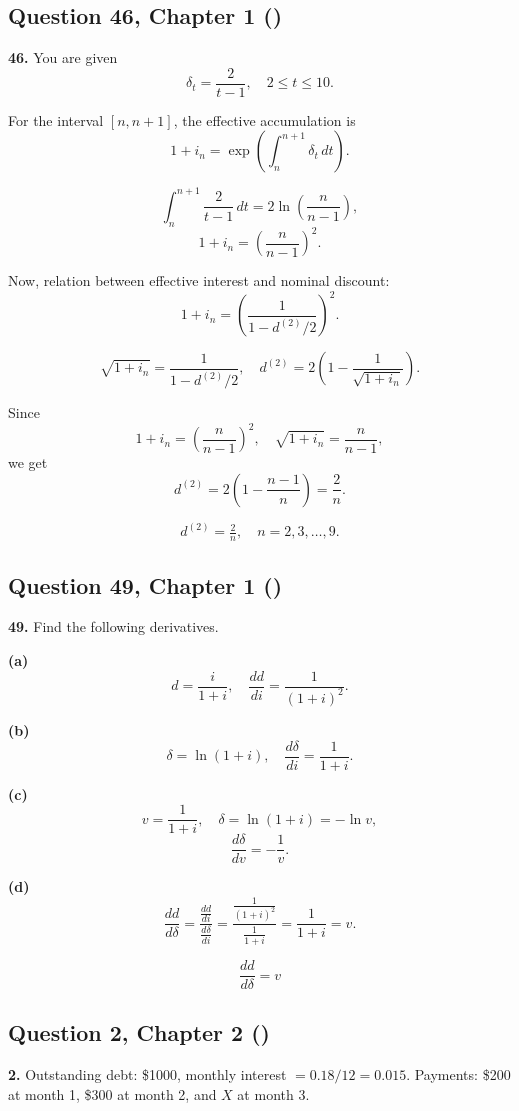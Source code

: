\documentclass[12pt, a4paper]{article}
\begin{document}
\subsection*{Question 46, Chapter 1  (\cite{toi3rd})}    

\textbf{46.} You are given 
\[
\delta_t = \frac{2}{t-1}, \quad 2 \leq t \leq 10.
\]

For the interval \([n, n+1]\), the effective accumulation is
\[
1+i_n = \exp\!\left(\int_n^{n+1} \delta_t \, dt\right).
\]

\[
\int_n^{n+1} \frac{2}{t-1} \, dt 
= 2 \ln\!\left(\frac{n}{n-1}\right),
\]
\[
1+i_n = \left(\frac{n}{n-1}\right)^2.
\]

Now, relation between effective interest and nominal discount:
\[
1+i_n = \left(\frac{1}{1-d^{(2)}/2}\right)^2.
\]

\[
\sqrt{1+i_n} = \frac{1}{1-d^{(2)}/2},
\quad d^{(2)} = 2\left(1 - \frac{1}{\sqrt{1+i_n}}\right).
\]

Since 
\[
1+i_n = \left(\frac{n}{n-1}\right)^2,
\quad \sqrt{1+i_n} = \frac{n}{n-1},
\]
we get
\[
d^{(2)} = 2\left(1 - \frac{n-1}{n}\right) = \frac{2}{n}.
\]

\[
\boxed{d^{(2)} = \tfrac{2}{n}, \quad n=2,3,\dots,9.}
\]

\subsection*{Question 49, Chapter 1  (\cite{toi3rd})}

\textbf{49.} Find the following derivatives.

\bigskip
\textbf{(a)} 
\[
d = \frac{i}{1+i}, 
\quad \frac{dd}{di} = \frac{1}{(1+i)^2}.
\]

\bigskip
\textbf{(b)} 
\[
\delta = \ln(1+i),
\quad \frac{d\delta}{di} = \frac{1}{1+i}.
\]

\textbf{(c)} 
\[
v = \frac{1}{1+i}, \quad 
\delta = \ln(1+i) = -\ln v,
\]
\[
\frac{d\delta}{dv} = -\frac{1}{v}.
\]

\textbf{(d)} 
\[
\frac{dd}{d\delta} 
= \frac{\tfrac{dd}{di}}{\tfrac{d\delta}{di}}
= \frac{\tfrac{1}{(1+i)^2}}{\tfrac{1}{1+i}}
= \frac{1}{1+i} = v.
\]

\[
\boxed{\frac{dd}{d\delta} = v}
\]

\subsection*{Question 2, Chapter 2 (\cite{toi3rd})}

\textbf{2.} Outstanding debt: \$1000, monthly interest \(= 0.18/12 = 0.015\).  
Payments: \$200 at month 1, \$300 at month 2, and \(X\) at month 3.
\end{document}
